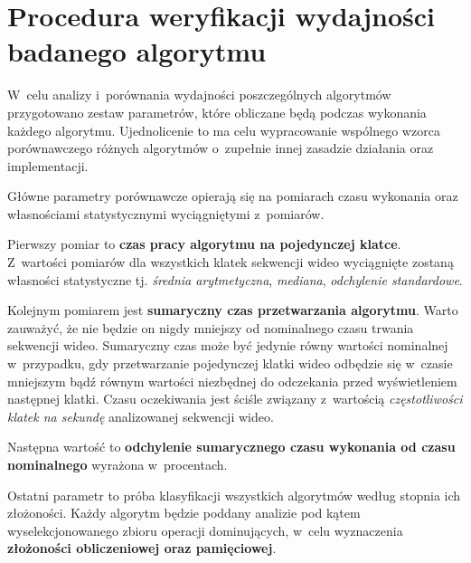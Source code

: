   \section{Procedura weryfikacji wydajności badanego algorytmu}\label{Section_Wydajnosc}

    W~celu analizy i~porównania wydajności poszczególnych algorytmów przygotowano zestaw parametrów, które obliczane będą podczas wykonania każdego algorytmu. Ujednolicenie to ma celu wypracowanie wspólnego wzorca porównawczego różnych algorytmów o~zupełnie innej zasadzie działania oraz implementacji.

    Główne parametry porównawcze opierają się na pomiarach czasu wykonania oraz własnościami statystycznymi wyciągniętymi z~pomiarów.

    Pierwszy pomiar to \textbf{czas pracy algorytmu na pojedynczej klatce}. Z~wartości pomiarów dla wszystkich klatek sekwencji wideo wyciągnięte zostaną własności statystyczne tj. \textit{średnia arytmetyczna}, \textit{mediana}, \textit{odchylenie standardowe}.

    Kolejnym pomiarem jest \textbf{sumaryczny czas przetwarzania algorytmu}. Warto zauważyć, że nie będzie on nigdy mniejszy od nominalnego czasu trwania sekwencji wideo. Sumaryczny czas może być jedynie równy wartości nominalnej w~przypadku, gdy przetwarzanie pojedynczej klatki wideo odbędzie się w~czasie mniejszym bądź równym wartości niezbędnej do odczekania przed wyświetleniem następnej klatki. Czasu oczekiwania jest ściśle związany z~wartością \textit{częstotliwości klatek na sekundę} analizowanej sekwencji wideo.

    Następna wartość to \textbf{odchylenie sumarycznego czasu wykonania od czasu nominalnego} wyrażona w~procentach.

    Ostatni parametr to próba klasyfikacji wszystkich algorytmów według stopnia ich złożoności. Każdy algorytm będzie poddany analizie pod kątem wyselekcjonowanego zbioru operacji dominujących, w~celu wyznaczenia \textbf{złożoności obliczeniowej oraz pamięciowej}.